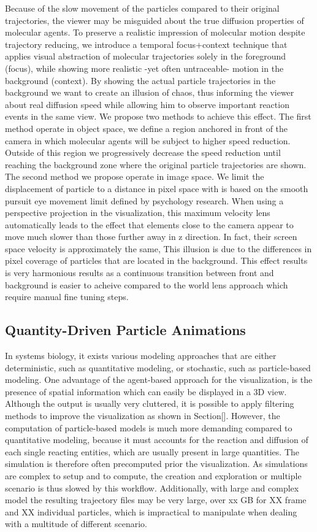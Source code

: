 Because of the slow movement of the particles compared to their original trajectories, the viewer may be misguided about the true diffusion properties of molecular agents.
To preserve a realistic impression of molecular motion despite trajectory reducing, we introduce a temporal focus+context technique that applies visual abstraction of molecular trajectories solely in the foreground (focus), while showing more realistic -yet often untraceable- motion in the background (context).
By showing the actual particle trajectories in the background we want to create an illusion of chaos, thus informing the viewer about real diffusion speed while allowing him to observe important reaction events in the same view.
We propose two methods to achieve this effect.
The first method operate in object space, we define a region anchored in front of the camera in which molecular agents will be subject to higher speed reduction.
Outside of this region we progressively decrease the speed reduction until reaching the background zone where the original particle trajectories are shown.
The second method we propose operate in image space.
We limit the displacement of particle to a distance in pixel space with is based on the smooth pursuit eye movement limit defined by psychology research.
When using a perspective projection in the visualization, this maximum velocity lens automatically leads to the effect that elements close to the camera appear to move much slower than those
further away in z direction. 
In fact, their screen space velocity is approximately the same, This illusion is due to the differences in pixel coverage of particles that are located in the background.
This effect results is very harmonious results as a continuous transition between front and background is easier to acheive compared to the world lens approach which require manual fine tuning steps.


\subsection{Quantity-Driven Particle Animations}

In systems biology, it exists various modeling approaches that are either deterministic, such as quantitative modeling, or stochastic, such as particle-based modeling.
One advantage of the agent-based approach for the visualization, is the presence of spatial information which can easily be displayed in a 3D view.
Although the output is usually very cluttered, it is possible to apply filtering methods to improve the visualization as shown in Section[].
However, the computation of particle-based models is much more demanding compared to quantitative modeling, because it must accounts for the reaction and diffusion of each single reacting entities, which are usually present in large quantities.
The simulation is therefore often precomputed prior the visualization.
As simulations are complex to setup and to compute, the creation and exploration or multiple scenario is thus slowed by this workflow.
Additionally, with large and complex model the resulting trajectory files may be very large, over xx GB for XX frame and XX individual particles, which is impractical to manipulate when dealing with a multitude of different scenario.


